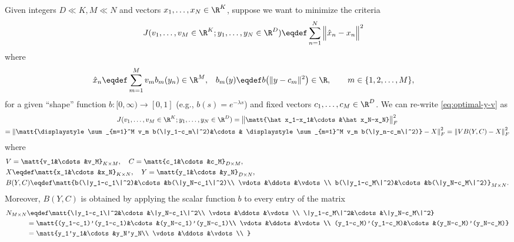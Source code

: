 \documentclass[11pt]{article}
\theoremstyle{remark}
\begin{document}
{Given integers $D\ll K,M\ll N$ and vectors $x_1,\dots,x_N\in\R^K$, suppose we want
to minimize the criteria
\begin{align}\label{eq:optimal-y-v}
  J(v_1,\dots,v_M\in\R^K; y_1,\dots,y_N\in\R^D)
  &\eqdef\sum_{n=1}^N \Big\| \hat x_n-x_n \Big\|^2
\end{align}
where
\begin{align*}
  \hat x_n&\eqdef  \sum_{m=1}^M v_m b_m(y_n)\in\R^M,&
  b_m(y)& \eqdef b\big(\|y-c_m\|^2\big)\in\R, \qquad m\in\{1,2,\dots,M\},
\end{align*}
for a given ``shape'' function $b:[0,\infty)\to[0,1]$ (e.g.,
$b(s)=e^{-\lambda s}$) and fixed vectors $c_1,\dots,c_M\in\R^D$. We can
re-write \eqref{eq:optimal-y-v} as 
\begin{multline}\label{eq:optimal-y-v}
  J(v_1,\dots,v_M\in\R^K; y_1,\dots,y_N\in\R^D)
  =\big\|\matt{\hat x_1-x_1&\cdots&\hat x_N-x_N}\big\|_F^2\\
  =\left\|  \matt{\displaystyle \sum_{m=1}^M v_m b(\|y_1-c_m\|^2)&\cdots& \displaystyle \sum_{m=1}^M v_m b(\|y_n-c_m\|^2)}-X\right\|_F^2
  =\left\| V B(Y,C)-X\right\|_F^2\\
\end{multline}
where
\begin{align*}
  &V=\matt{v_1&\cdots&v_M}_{K\times M}, \quad
  C=\matt{c_1&\cdots&c_M}_{D\times M}, \\
  &X\eqdef\matt{x_1&\cdots&x_N}_{K\times N}, \quad
  Y=\matt{y_1&\cdots&y_N}_{D\times N}, \\
  &B(Y,C)\eqdef\matt{b(\|y_1-c_1\|^2)&\cdots&b(\|y_N-c_1\|^2)\\
    \vdots&\ddots&\vdots\\
    b(\|y_1-c_M\|^2)&\cdots&b(\|y_N-c_M\|^2)}_{M\times N}.
\end{align*}
Moreover, $B(Y,C)$ is obtained by applying the scalar function $b$ to
every entry of the matrix
\begin{align*}
  N_{M\times N}&\eqdef \matt{\|y_1-c_1\|^2&\cdots&\|y_N-c_1\|^2\\
    \vdots&\ddots&\vdots\\
    \|y_1-c_M\|^2&\cdots&\|y_N-c_M\|^2}\\
  &=\matt{(y_1-c_1)'(y_1-c_1)&\cdots&(y_N-c_1)'(y_N-c_1)\\
    \vdots&\ddots&\vdots\\
    (y_1-c_M)'(y_1-c_M)&\cdots&(y_N-c_M)'(y_N-c_M)}\\
  &=\matt{y_1'y_1&\cdots&y_N'y_N\\
    \vdots&\ddots&\vdots\\
}
\end{align*}}
\end{document}
